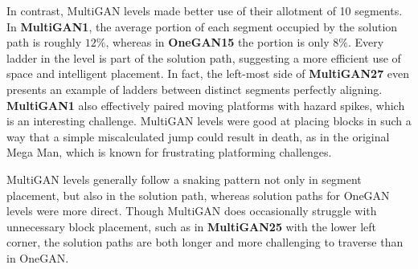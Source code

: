 

In contrast, MultiGAN levels 
made better use of their allotment of 10 segments.
In \textbf{MultiGAN1}, the average portion of each segment occupied by the solution path is roughly $12\%$, whereas in \textbf{OneGAN15} the portion is only $8\%$. Every ladder in the level is part of the solution path, suggesting a more efficient use of space and intelligent placement. In fact, the left-most side of \textbf{MultiGAN27} even presents an example of ladders between distinct segments perfectly aligning.
\textbf{MultiGAN1} also effectively paired moving platforms with hazard spikes, which is an interesting challenge. MultiGAN levels were good at placing blocks in such a way that a simple miscalculated jump could result in death, as in the original Mega Man, which is known for frustrating platforming challenges. 

MultiGAN levels generally follow a snaking pattern not only in segment placement, but also in the solution path, whereas solution paths for OneGAN levels were more direct. Though MultiGAN does occasionally struggle with unnecessary block placement, such as in \textbf{MultiGAN25} with the lower left corner, the solution paths are both longer and more challenging to traverse than in OneGAN. 


